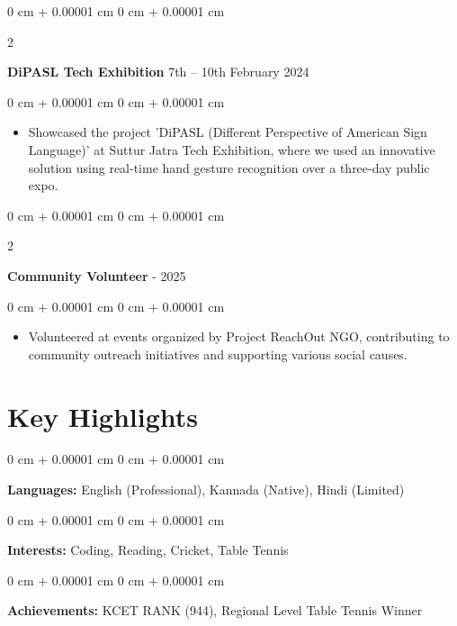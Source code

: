 \documentclass[10pt, letterpaper]{article}
\newenvironment{highlights}{
    \begin{itemize}[
        topsep=0.10 cm,
        parsep=0.10 cm,
        partopsep=0pt,
        itemsep=0pt,
        leftmargin=0 cm + 10pt
    ]
}{
    \end{itemize}
} %
\newenvironment{onecolentry}{
    \begin{adjustwidth}{
        0 cm + 0.00001 cm
    }{
        0 cm + 0.00001 cm
    }
}{
    \end{adjustwidth}
} %
\newenvironment{twocolentry}[2][]{
    \onecolentry
    \def\secondColumn{#2}
    \setcolumnwidth{\fill, 4.5 cm}
    \begin{paracol}{2}
}{
    \switchcolumn \raggedleft \secondColumn
    \end{paracol}
    \endonecolentry
} %
\begin{document}
        \vspace{0.2 cm}

        \begin{twocolentry}{
            7th – 10th February 2024
        }
            \textbf{DiPASL Tech Exhibition}\end{twocolentry}
        \vspace{0.05 cm}
        \begin{onecolentry}
            \begin{highlights}
                \item Showcased the project 'DiPASL (Different Perspective of American Sign Language)' at Suttur Jatra Tech Exhibition, where we used an innovative solution using real-time hand gesture recognition over a three-day public expo.
            \end{highlights}
        \end{onecolentry}

        \vspace{0.2 cm}

        \begin{twocolentry}{
        2024 - 2025
        }
            \textbf{Community Volunteer}\end{twocolentry}
        \vspace{0.05 cm}
        \begin{onecolentry}
            \begin{highlights}
                \item Volunteered at events organized by Project ReachOut NGO, contributing to community outreach initiatives and supporting various social causes.
            \end{highlights}
        \end{onecolentry}

    \section{Key Highlights}

        \begin{onecolentry}
            \textbf{Languages:} English (Professional), Kannada (Native), Hindi (Limited)
        \end{onecolentry}

        \vspace{0.2 cm}

        \begin{onecolentry}
            \textbf{Interests:} Coding, Reading, Cricket, Table Tennis
        \end{onecolentry}

        \vspace{0.2 cm}

        \begin{onecolentry}
            \textbf{Achievements:} KCET RANK (944), Regional Level Table Tennis Winner
        \end{onecolentry}
\end{document}
